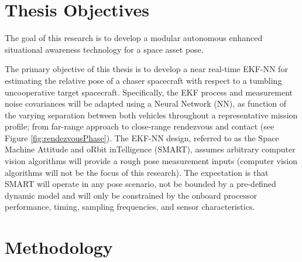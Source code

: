 \section{Thesis Objectives}\label{CHAP1_4}

The goal of this research is to develop a modular autonomous enhanced situational awareness technology for a space asset pose.

The primary objective of this thesis is to develop a near real-time EKF-NN for estimating the relative pose of a chaser spacecraft with respect to a tumbling uncooperative target spacecraft. Specifically, the EKF process and measurement noise covariances will be adapted using a Neural Network (NN), as function of the varying separation between both vehicles throughout a representative mission profile; from far-range approach to close-range rendezvous and contact (see Figure \ref{fig:rendezvousPhase}). The EKF-NN design, referred to as the Space Machine Attitude and oRbit inTelligence (SMART), assumes arbitrary computer vision algorithms will provide a rough pose measurement inputs (computer vision algorithms will not be the focus of this research). The expectation is that SMART will operate in any pose scenario, not be bounded by a pre-defined dynamic model and will only be constrained by the onboard processor performance, timing, sampling frequencies, and sensor characteristics.


\section{Methodology}\label{CHAP1_5}


